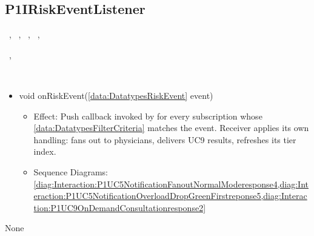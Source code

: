   \subsection{P1IRiskEventListener}\label{int:InterfacesP1IRiskEventListener}
    \begin{description}
      \item[Provided by:] \iconcomponent{}~, \iconcomponent{}~, \iconcomponent{}~, \iconcomponent{}~, \iconcomponent{}~
      \item[Required by:] \iconcomponent{}~, \iconcomponent{}~ 
      \item[Operations:] ~
    \begin{itemize}[noitemsep,nolistsep,leftmargin=-.25cm]
      \item \textsf{void onRiskEvent(\ref{data:DatatypesRiskEvent} event)}
        \begin{itemize}[noitemsep,nolistsep]
           \item Effect: Push callback invoked by  for every subscription whose \ref{data:DatatypesFilterCriteria} matches the event. Receiver applies its own handling:  fans out to physicians,  delivers UC9 results,  refreshes its tier index. 
           \item Sequence Diagrams: \cref{diag:Interaction:P1UC5NotificationFanoutNormalModeresponse4,diag:Interaction:P1UC5NotificationOverloadDropGreenFirstreponse5,diag:Interaction:P1UC9OnDemandConsultationresponse2}
        \end{itemize}
    \end{itemize}
      \item[Diagrams:] None
    \end{description}

